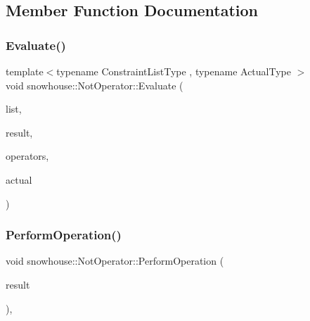 \subsection{Member Function Documentation}
\mbox{\label{structsnowhouse_1_1NotOperator_aeeea8b6884150f3c023266eeb3390de1}} 
\subsubsection{\texorpdfstring{Evaluate()}{Evaluate()}}
{\footnotesize\ttfamily template$<$typename Constraint\+List\+Type , typename Actual\+Type $>$ \\
void snowhouse\+::\+Not\+Operator\+::\+Evaluate (\begin{DoxyParamCaption}\item[{Constraint\+List\+Type \&}]{list,  }\item[{\mbox{\hyperlink{namespacesnowhouse_a719169b1315a13161c15f25e600a8f51}{Result\+Stack}} \&}]{result,  }\item[{\mbox{\hyperlink{namespacesnowhouse_adcb10e215e6a4bbcb35722a9c7270fc6}{Operator\+Stack}} \&}]{operators,  }\item[{const Actual\+Type \&}]{actual }\end{DoxyParamCaption})\hspace{0.3cm}{\ttfamily [inline]}}

\mbox{\label{structsnowhouse_1_1NotOperator_af2dc2b844260fd317207960087bd074f}} 
\subsubsection{\texorpdfstring{PerformOperation()}{PerformOperation()}}
{\footnotesize\ttfamily void snowhouse\+::\+Not\+Operator\+::\+Perform\+Operation (\begin{DoxyParamCaption}\item[{\mbox{\hyperlink{namespacesnowhouse_a719169b1315a13161c15f25e600a8f51}{Result\+Stack}} \&}]{result }\end{DoxyParamCaption})\hspace{0.3cm}{\ttfamily [inline]}, {\ttfamily [virtual]}}



